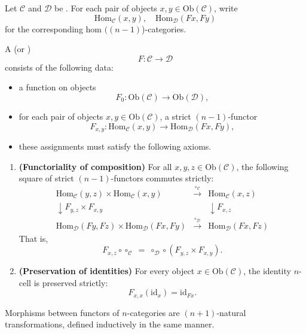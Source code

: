 \begin{definition}
    Let $\mathcal{C}$ and $\mathcal{D}$ be .  
    For each pair of objects $x, y \in \mathrm{Ob}(\mathcal{C})$, write 
    $$ \mathrm{Hom}_{\mathcal{C}}(x, y), \quad \mathrm{Hom}_{\mathcal{D}}(Fx, Fy) $$
    for the corresponding hom $((n-1)$)-categories.  

    A  (or )
    $$ F : \mathcal{C} \longrightarrow \mathcal{D} $$
    consists of the following data:
    \begin{itemize}
    \item a function on objects
    $$
    F_0 : \mathrm{Ob}(\mathcal{C}) \to \mathrm{Ob}(\mathcal{D}),
    $$
    \item for each pair of objects $x, y \in \mathrm{Ob}(\mathcal{C})$, a strict $(n-1)$-functor
    $$
    F_{x,y} : \mathrm{Hom}_{\mathcal{C}}(x, y) \to \mathrm{Hom}_{\mathcal{D}}(Fx, Fy),
    $$
    \item these assignments must satisfy the following axioms.
\end{itemize}

\begin{enumerate}
  \item \textbf{(Functoriality of composition)}  
  For all $x, y, z \in \mathrm{Ob}(\mathcal{C})$, the following square of strict $(n-1)$-functors commutes strictly:
  $$
  \begin{array}{ccc}
  \mathrm{Hom}_{\mathcal{C}}(y,z) \times \mathrm{Hom}_{\mathcal{C}}(x,y) & \xrightarrow{\circ_\mathcal{C}} & \mathrm{Hom}_{\mathcal{C}}(x,z) \\
  \downarrow F_{y,z} \times F_{x,y} & & \downarrow F_{x,z} \\
  \mathrm{Hom}_{\mathcal{D}}(Fy,Fz) \times \mathrm{Hom}_{\mathcal{D}}(Fx,Fy) & \xrightarrow{\circ_\mathcal{D}} & \mathrm{Hom}_{\mathcal{D}}(Fx,Fz)
  \end{array}
  $$
  That is,
  $$
  F_{x,z} \circ \circ_\mathcal{C} \;=\; \circ_\mathcal{D} \circ (F_{y,z} \times F_{x,y}).
  $$

  \item \textbf{(Preservation of identities)}  
  For every object $x \in \mathrm{Ob}(\mathcal{C})$, the identity $n$-cell is preserved strictly:
  $$
  F_{x,x}(\mathrm{id}_x) = \mathrm{id}_{Fx}.
  $$
\end{enumerate}

Morphisms between functors of $n$-categories are $(n+1)$-natural transformations, defined inductively in the same manner.
\end{definition}



